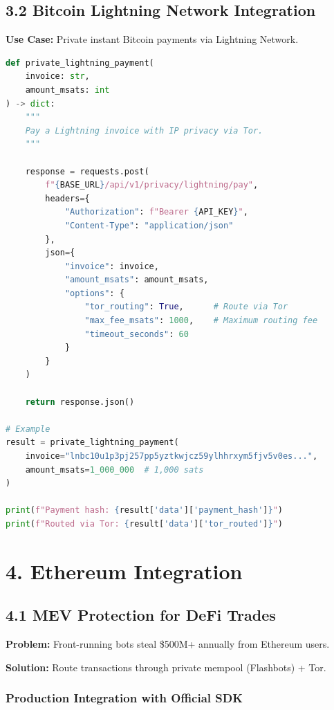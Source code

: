 \documentclass[11pt,a4paper]{article}
\begin{document}
\subsection{3.2 Bitcoin Lightning Network Integration}

\textbf{Use Case:} Private instant Bitcoin payments via Lightning Network.

\begin{lstlisting}[language=python]
def private_lightning_payment(
    invoice: str,
    amount_msats: int
) -> dict:
    """
    Pay a Lightning invoice with IP privacy via Tor.
    """

    response = requests.post(
        f"{BASE_URL}/api/v1/privacy/lightning/pay",
        headers={
            "Authorization": f"Bearer {API_KEY}",
            "Content-Type": "application/json"
        },
        json={
            "invoice": invoice,
            "amount_msats": amount_msats,
            "options": {
                "tor_routing": True,      # Route via Tor
                "max_fee_msats": 1000,    # Maximum routing fee
                "timeout_seconds": 60
            }
        }
    )

    return response.json()

# Example
result = private_lightning_payment(
    invoice="lnbc10u1p3pj257pp5yztkwjcz59ylhhrxym5fjv5v0es...",
    amount_msats=1_000_000  # 1,000 sats
)

print(f"Payment hash: {result['data']['payment_hash']}")
print(f"Routed via Tor: {result['data']['tor_routed']}")
\end{lstlisting}

\section{4. Ethereum Integration}

\subsection{4.1 MEV Protection for DeFi Trades}

\textbf{Problem:} Front-running bots steal \$500M+ annually from Ethereum users.

\textbf{Solution:} Route transactions through private mempool (Flashbots) + Tor.

\subsubsection{Production Integration with Official SDK}
\end{document}
